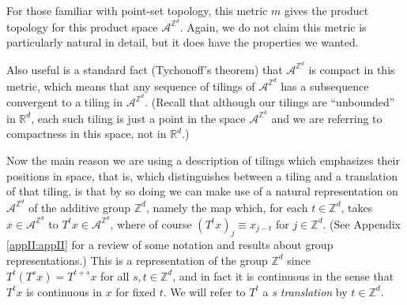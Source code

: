 \documentclass[reqno]{stml-l}
\theoremstyle{plain}
\theoremstyle{definition}
\numberwithin{equation}{chapter}
\begin{document}
For those familiar with point-set topology, this metric $m$
gives the product topology for this product space
$\mathcal{A}^{\mathbb{Z}^{d}}$. Again, we do not claim this
metric is particularly natural in detail, but it does have
the properties we wanted.

Also useful is a standard fact (Tychonoff's theorem) that
$\mathcal{A}^{\mathbb{Z}^{d}}$ is compact in this metric,
which means that any sequence of tilings of
$\mathcal{A}^{\mathbb{Z}^{d}}$ has a subsequence convergent
to a tiling in $\mathcal{A}^{\mathbb{Z}^{d}}$.  (Recall
that although our tilings are ``unbounded'' in
$\mathbb{R}^{d}$, each such tiling is just a point in the
space $\mathcal{A}^{\mathbb{Z}^{d}}$ and we are referring
to compactness in this space, not in $\mathbb{R}^{d}$.)

Now the main reason we are using a description of tilings
which emphasizes their positions in space, that is, which
distinguishes between a tiling and a translation of that
tiling, is that by so doing we can make use of a natural
representation on $\mathcal{A}^{\mathbb{Z}^{d}}$ of the
additive group $\mathbb{Z}^{d}$, namely the map which, for
each $t\in \mathbb{Z}^{d}$, takes $x\in
\mathcal{A}^{\mathbb{Z}^{d}}$ to $T^{t}x\in
\mathcal{A}^{\mathbb{Z}^{d}}$, where of course
$(T^{t}x)_{j}\equiv x_{j-t}$ for $j\in \mathbb{Z}^{d}$.
(See Appendix \ref{appII:appII} for a review of some notation and results
about group representations.) This is a representation of
the group $\mathbb{Z}^{d}$ since $T^{t}(T^{s}x)=T^{t+s}x$
for all $s,t\in \mathbb{Z}^{d}$, and in fact it is
continuous in the sense that $T^{t}x$ is continuous in $x$
for fixed $t$. We will refer to $T^{t}$ a \emph{s
translation} by $t\in \mathbb{Z}^{d}$.
\end{document}
